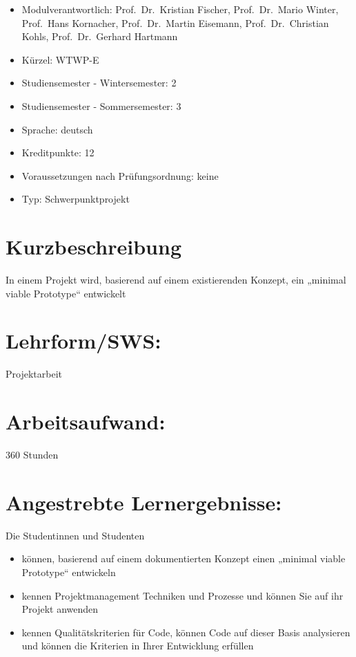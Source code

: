 \begin{itemize}
\tightlist
\item
  Modulverantwortlich: Prof.~Dr.~Kristian Fischer, Prof.~Dr.~Mario
  Winter, Prof.~Hans Kornacher, Prof.~Dr.~Martin Eisemann,
  Prof.~Dr.~Christian Kohls, Prof.~Dr.~Gerhard Hartmann
\item
  Kürzel: WTWP-E
\item
  Studiensemester - Wintersemester: 2
\item
  Studiensemester - Sommersemester: 3
\item
  Sprache: deutsch
\item
  Kreditpunkte: 12
\item
  Voraussetzungen nach Prüfungsordnung: keine
\item
  Typ: Schwerpunktprojekt
\end{itemize}

\section*{Kurzbeschreibung}\label{kurzbeschreibung-2}

In einem Projekt wird, basierend auf einem existierenden Konzept, ein
„minimal viable Prototype`` entwickelt

\section*{Lehrform/SWS:}\label{lehrformsws-8}

Projektarbeit

\section*{Arbeitsaufwand:}\label{arbeitsaufwand-14}

360 Stunden

\section*{Angestrebte
Lernergebnisse:}\label{angestrebte-lernergebnisse-8}

Die Studentinnen und Studenten

\begin{itemize}
\tightlist
\item
  können, basierend auf einem dokumentierten Konzept einen „minimal
  viable Prototype`` entwickeln
\item
  kennen Projektmanagement Techniken und Prozesse und können Sie auf ihr
  Projekt anwenden
\item
  kennen Qualitätskriterien für Code, können Code auf dieser Basis
  analysieren und können die Kriterien in Ihrer Entwicklung erfüllen
\end{itemize}


